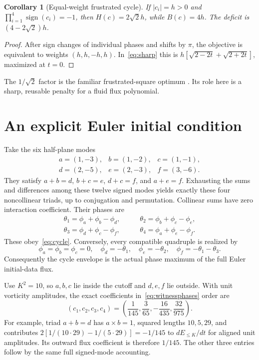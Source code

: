 \documentclass[11pt]{article}
\newtheorem{corollary}[theorem]{Corollary}
\begin{document}
\begin{corollary}[Equal-weight frustrated cycle]\label{cor:balanced}
If $|c_i|=h>0$ and $\prod_{i=1}^4\operatorname{sign}(c_i)=-1$, then $H(c)=2\sqrt2h$, while $B(c)=4h$. The deficit is $(4-2\sqrt2)h$.
\end{corollary}
\begin{proof}
After sign changes of individual phases and shifts by $\pi$, the objective is equivalent to weights $(h,h,-h,h)$. In~\eqref{eq:sharp} this is $h[\sqrt{2-2t}+\sqrt{2+2t}]$, maximized at $t=0$.
\end{proof}
The $1/\sqrt2$ factor is the familiar frustrated-square optimum \cite{diep}. Its role here is a sharp, reusable penalty for a fluid flux polynomial.

\section{An explicit Euler initial condition}\label{sec:witness}
Take the six half-plane modes
\begin{equation}\label{eq:modes}
 \begin{array}{lll}
 a=(1,-3),&b=(1,-2),&c=(1,-1),\\
 d=(2,-5),&e=(2,-3),&f=(3,-6).
 \end{array}
\end{equation}
They satisfy $a+b=d$, $b+c=e$, $d+c=f$, and $a+e=f$. Exhausting the sums and differences among these twelve signed modes yields exactly these four noncollinear triads, up to conjugation and permutation. Collinear sums have zero interaction coefficient. Their phases are
\begin{equation}\label{eq:witnessphases}
 \begin{split}
 \theta_1=\phi_a+\phi_b-\phi_d,&\qquad\theta_2=\phi_b+\phi_c-\phi_e,\\
 \theta_3=\phi_d+\phi_c-\phi_f,&\qquad\theta_4=\phi_a+\phi_e-\phi_f.
 \end{split}
\end{equation}
These obey~\eqref{eq:cycle}. Conversely, every compatible quadruple is realized by
\begin{equation}\label{eq:construct}
 \phi_a=\phi_b=\phi_c=0,\quad
 \phi_d=-\theta_1,\quad\phi_e=-\theta_2,\quad\phi_f=-\theta_1-\theta_3.
\end{equation}
Consequently the cycle envelope is the actual phase maximum of the full Euler initial-data flux.

Use $K^2=10$, so $a,b,c$ lie inside the cutoff and $d,e,f$ lie outside. With unit vorticity amplitudes, the exact coefficients in~\eqref{eq:witnessphases} order are
\begin{equation}\label{eq:coeffwitness}
 (c_1,c_2,c_3,c_4)=\left(\frac1{145},\frac3{65},-\frac{16}{435},\frac{32}{975}\right).
\end{equation}
For example, triad $a+b=d$ has $a\times b=1$, squared lengths $10,5,29$, and contributes
$2[1/(10\cdot29)-1/(5\cdot29)]=-1/145$ to $dE_{\le K}/dt$ for aligned unit amplitudes. Its outward flux coefficient is therefore $1/145$. The other three entries follow by the same full signed-mode accounting.
\end{document}
